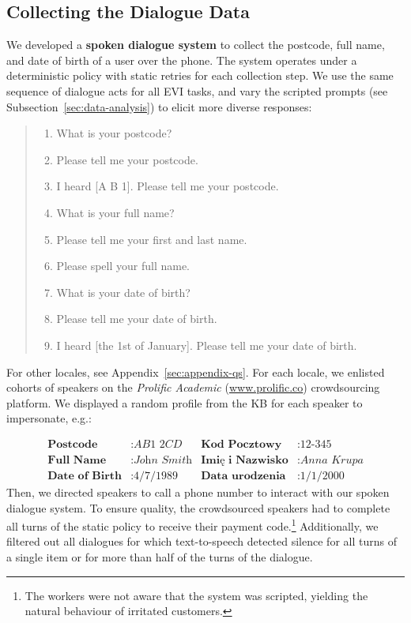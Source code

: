 \documentclass[11pt]{article}
\begin{document}
{\subsection{Collecting the Dialogue Data}
\label{sec:data-collection}

We developed a \textbf{spoken dialogue system}
to collect the postcode, full name, and date of birth
of a user over the phone.
The system operates under a deterministic policy
with static retries for each collection step.
We use the same sequence of dialogue acts for all EVI tasks,
and vary the scripted prompts (see Subsection~\ref{sec:data-analysis}) to elicit more diverse responses:
\begin{quote}
{\small
\begin{enumerate}[label=Q\arabic*:,align=left, leftmargin=*]
    \item What is your postcode?
    \item Please tell me your postcode.
    \item I heard [A B 1]. Please tell me your postcode.
    \item What is your full name?
    \item Please tell me your first and last name.
    \item Please spell your full name.
    \item What is your date of birth?
    \item Please tell me your date of birth.
    \item I heard [the 1st of January]. Please tell me your date of birth.
\end{enumerate}}\end{quote}

For other locales, see Appendix~\ref{sec:appendix-qs}. For each locale, we enlisted cohorts of speakers on the \emph{Prolific Academic} (\url{www.prolific.co}) crowdsourcing platform. We displayed a random profile from the KB for each speaker to impersonate, e.g.:


\vspace{-2.5mm}
{\small
\begin{align*}
\textbf{Postcode}&: \textit{AB1 2CD} & \textbf{Kod Pocztowy}&: \textit{12-345} \\
\textbf{Full Name}&: \textit{John Smith} & \textbf{Imię i Nazwisko}&: \textit{Anna Krupa} \\
\textbf{Date of Birth}&: \textit{4/7/1989} & \textbf{Data urodzenia}&: \textit{1/1/2000}
\end{align*}}Then, we directed speakers to call a phone number to interact with our spoken dialogue system. To ensure quality, the crowdsourced speakers had to complete all turns of the static policy to receive their payment code.\footnote{The workers were not aware that the system was scripted, yielding the natural behaviour of irritated customers.}
Additionally, we filtered out all dialogues for which text-to-speech detected silence for all turns of a single item or for more than half of the turns of the dialogue.

}
\end{document}
